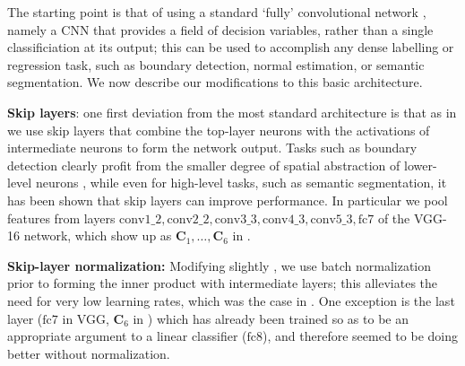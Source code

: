 \documentclass[10pt,twocolumn,letterpaper]{article}
\begin{document}
 The starting point is that of using a standard  `fully' convolutional network  \cite{LeCun1998,SEZM+14,PapandreouKS15,LongSD15}, namely a CNN that provides   a field of decision variables, rather than a single classificiation at its output; this can be used to accomplish any dense labelling or regression task, such as boundary detection, normal estimation, or semantic segmentation. We now describe our modifications to this basic architecture. 


{\textbf{Skip layers}}: one first deviation from the most standard architecture is that as in \cite{SEZM+14,hariharan2014hypercolumns,hed,iclr16} we use skip layers that combine the top-layer neurons with the activations of intermediate neurons to form the network output. Tasks such as boundary detection clearly profit from the smaller degree of spatial abstraction of lower-level neurons \cite{hed}, while even for high-level tasks, such as semantic segmentation, it has been shown \cite{hariharan2014hypercolumns,LongSD15} that  skip layers can improve performance. In particular  we pool features from layers  $\mathrm{conv1\_2, conv2\_2, conv3\_3, conv4\_3, conv5\_3, fc7}$ of the VGG-16 network, which show up as $\mathbf{C}_1,\ldots,\mathbf{C}_6$ in . 

{\textbf{Skip-layer normalization:}} Modifying slightly \cite{parsenet,bell16ion}, we  use batch normalization \cite{batchnorm} prior to forming the inner product with intermediate layers; this alleviates the need for very low learning rates, which was the case in \cite{hed,iclr16}. One exception is the last layer ($\mathrm{fc7}$ in VGG, $\mathbf{C}_6$ in ) which has already been trained so as to be an appropriate argument to a linear classifier ($\mathrm{fc8}$), and therefore seemed  to be doing better without normalization.



\newcommand{\neuron}{\mathbf{f}}
\newcommand{\scoret}{\mathbf{s}}
\newcommand{\weight}{\mathbf{w}}
\newcommand{\is}{}
\end{document}
